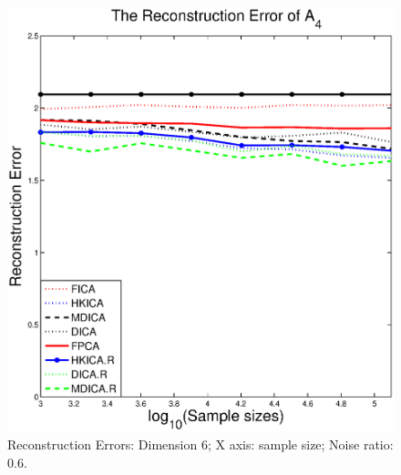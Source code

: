 \begin{figure}[t]
	\includegraphics[width =0.45\columnwidth]{images/error4_sample_noise6}
\caption{
\label{fig:Error_sample_noise6}
 Reconstruction Errors: Dimension 6; X axis: sample size; Noise ratio: 0.6.}
\end{figure}
\fi

